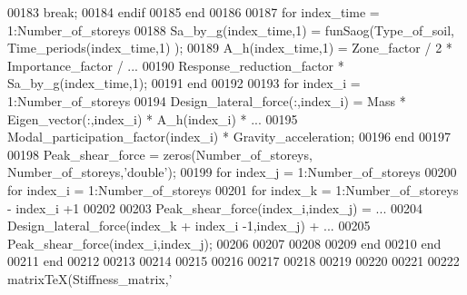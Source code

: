 \begin{DoxyCode}
{{{{{{{{{{{{{{{{{{{{{00183 \textcolor{stringliteral}{    break;}
00184 \textcolor{stringliteral}{  endif}
00185 \textcolor{stringliteral}{end}
00186 \textcolor{stringliteral}{}
00187 \textcolor{stringliteral}{for index\_time = 1:Number\_of\_storeys}
00188 \textcolor{stringliteral}{  Sa\_by\_g(index\_time,1) = funSaog(Type\_of\_soil, Time\_periods(index\_time,1) );}
00189 \textcolor{stringliteral}{  A\_h(index\_time,1) = Zone\_factor / 2 * Importance\_factor / ...}
00190 \textcolor{stringliteral}{    Response\_reduction\_factor * Sa\_by\_g(index\_time,1);}
00191 \textcolor{stringliteral}{end  }
00192 \textcolor{stringliteral}{}
00193 \textcolor{stringliteral}{for index\_i = 1:Number\_of\_storeys}
00194 \textcolor{stringliteral}{  Design\_lateral\_force(:,index\_i) = Mass * Eigen\_vector(:,index\_i) * A\_h(index\_i) * ...}
00195 \textcolor{stringliteral}{  Modal\_participation\_factor(index\_i) * Gravity\_acceleration;}
00196 \textcolor{stringliteral}{end}
00197 \textcolor{stringliteral}{}
00198 \textcolor{stringliteral}{Peak\_shear\_force = zeros(Number\_of\_storeys, Number\_of\_storeys,'}\textcolor{keywordtype}{double}\textcolor{stringliteral}{');}
00199 \textcolor{stringliteral}{for index\_j = 1:Number\_of\_storeys}
00200 \textcolor{stringliteral}{  for index\_i = 1:Number\_of\_storeys}
00201 \textcolor{stringliteral}{      for index\_k = 1:Number\_of\_storeys - index\_i +1}
00202 \textcolor{stringliteral}{     %
00203 \textcolor{stringliteral}{      Peak\_shear\_force(index\_i,index\_j) = ...}
00204 \textcolor{stringliteral}{        Design\_lateral\_force(index\_k + index\_i -1,index\_j) + ...}
00205 \textcolor{stringliteral}{        Peak\_shear\_force(index\_i,index\_j);}
00206 \textcolor{stringliteral}{        %
00207 \textcolor{stringliteral}{        %
00208 \textcolor{stringliteral}{        %
00209 \textcolor{stringliteral}{    end    }
00210 \textcolor{stringliteral}{  end  }
00211 \textcolor{stringliteral}{end}
00212 \textcolor{stringliteral}{}
00213 \textcolor{stringliteral}{%
00214 \textcolor{stringliteral}{}
00215 \textcolor{stringliteral}{%
00216 \textcolor{stringliteral}{}
00217 \textcolor{stringliteral}{%
00218 \textcolor{stringliteral}{%
00219 \textcolor{stringliteral}{}
00220 \textcolor{stringliteral}{%
00221 \textcolor{stringliteral}{}
00222 \textcolor{stringliteral}{matrixTeX(Stiffness\_matrix,'}%
}}}}}}}}}}}}}}}}}}}}}}}}}}}}}}
\end{DoxyCode}
